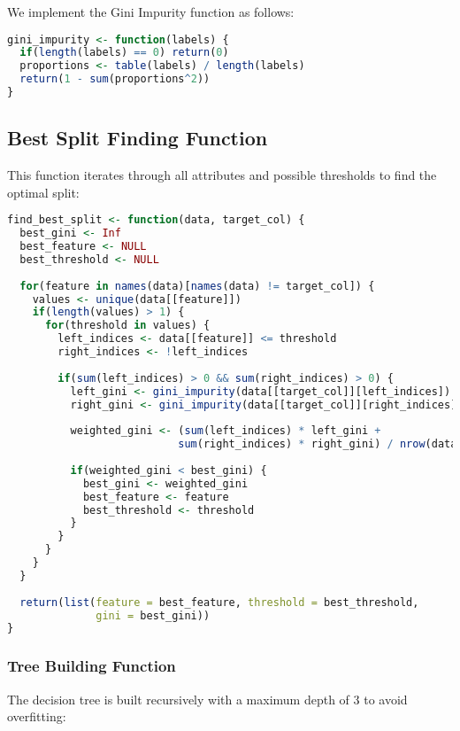 We implement the Gini Impurity function as follows:

\begin{lstlisting}[language=R, caption=Gini Impurity Function]
gini_impurity <- function(labels) {
  if(length(labels) == 0) return(0)
  proportions <- table(labels) / length(labels)
  return(1 - sum(proportions^2))
}
\end{lstlisting}

\subsection{Best Split Finding Function}

This function iterates through all attributes and possible thresholds to find the optimal split:

\begin{lstlisting}[language=R, caption=Best Split Finding Function]
find_best_split <- function(data, target_col) {
  best_gini <- Inf
  best_feature <- NULL
  best_threshold <- NULL
  
  for(feature in names(data)[names(data) != target_col]) {
    values <- unique(data[[feature]])
    if(length(values) > 1) {
      for(threshold in values) {
        left_indices <- data[[feature]] <= threshold
        right_indices <- !left_indices
        
        if(sum(left_indices) > 0 && sum(right_indices) > 0) {
          left_gini <- gini_impurity(data[[target_col]][left_indices])
          right_gini <- gini_impurity(data[[target_col]][right_indices])
          
          weighted_gini <- (sum(left_indices) * left_gini + 
                           sum(right_indices) * right_gini) / nrow(data)
          
          if(weighted_gini < best_gini) {
            best_gini <- weighted_gini
            best_feature <- feature
            best_threshold <- threshold
          }
        }
      }
    }
  }
  
  return(list(feature = best_feature, threshold = best_threshold, 
              gini = best_gini))
}
\end{lstlisting}

\subsubsection{Tree Building Function}

The decision tree is built recursively with a maximum depth of 3 to avoid overfitting:

